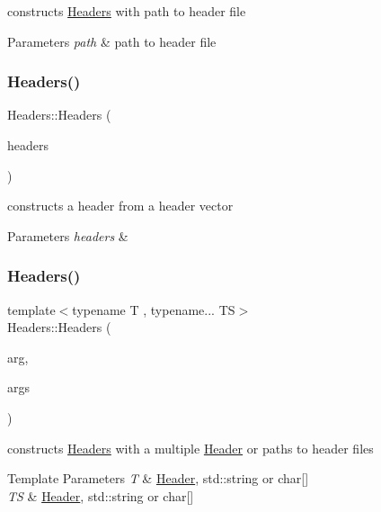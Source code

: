 constructs \hyperlink{classyacx_1_1_headers}{Headers} with path to header file 
\begin{DoxyParams}{Parameters}
{\em path} & path to header file \\
\hline
\end{DoxyParams}
\mbox{\label{classyacx_1_1_headers_a4741fcbd110385f037be9091e20fd4a9}} 
\subsubsection{\texorpdfstring{Headers()}{Headers()}\hspace{0.1cm}{\footnotesize\ttfamily [3/4]}}
{\footnotesize\ttfamily Headers\+::\+Headers (\begin{DoxyParamCaption}\item[{std\+::vector$<$ \hyperlink{classyacx_1_1_header}{Header} $>$}]{headers }\end{DoxyParamCaption})\hspace{0.3cm}{\ttfamily [explicit]}}

constructs a header from a header vector 
\begin{DoxyParams}{Parameters}
{\em headers} & \\
\hline
\end{DoxyParams}
\mbox{\label{classyacx_1_1_headers_a2c695f86d62e478719878b37027e6cde}} 
\subsubsection{\texorpdfstring{Headers()}{Headers()}\hspace{0.1cm}{\footnotesize\ttfamily [4/4]}}
{\footnotesize\ttfamily template$<$typename T , typename... TS$>$ \\
Headers\+::\+Headers (\begin{DoxyParamCaption}\item[{const T \&}]{arg,  }\item[{const TS \&...}]{args }\end{DoxyParamCaption})}

constructs \hyperlink{classyacx_1_1_headers}{Headers} with a multiple \hyperlink{classyacx_1_1_header}{Header} or paths to header files 
\begin{DoxyTemplParams}{Template Parameters}
{\em T} & \hyperlink{classyacx_1_1_header}{Header}, std\+::string or char\mbox{[}\mbox{]} \\
\hline
{\em TS} & \hyperlink{classyacx_1_1_header}{Header}, std\+::string or char\mbox{[}\mbox{]} \\
\hline
\end{DoxyTemplParams}

